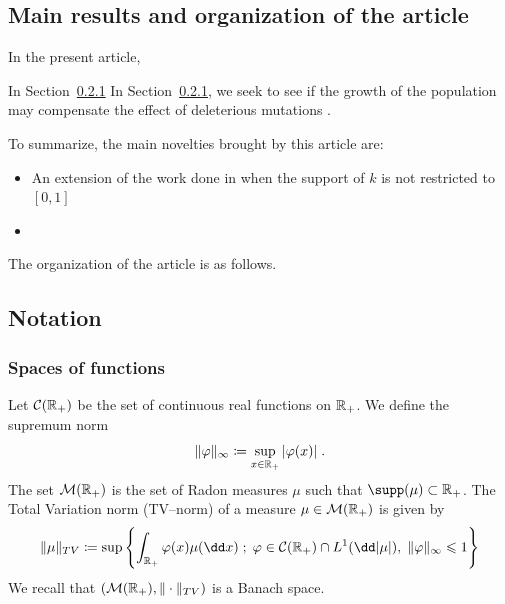 
\subsection{Main results and organization of the article} \mbox{}

In the present article, 

In Section~\ref{}
In Section~\ref{}, we seek to see if the growth of the population may compensate the effect of deleterious mutations . 

To summarize, the main novelties brought by this article are: 
\begin{itemize}
    \item An extension of the work done in \cite{doumic2016time} when the support of $k$ is not restricted to $[0,1]$
    \item 
\end{itemize}

The organization of the article is as follows.

\subsection{Notation}

\subsubsection{Spaces of functions}

Let $\mathcal{C}(\mathbb{R}_+)$ be the set of continuous real functions on $\mathbb{R}_+$. We define the supremum norm
\begin{equation*}
    \|\varphi\|_{\infty} \coloneqq\sup_{x \in \mathbb{R}_+} |\varphi(x)| 
    \; .
\end{equation*}
The set $\mathcal{M}(\mathbb{R}_+)$ is the set of Radon measures $\mu$ such that $\supp(\mu) \subset \RR_+$. The Total Variation norm (TV--norm) of a measure $\mu \in \mathcal{M}(\mathbb{R}_+)$ is given by 
    \begin{equation*}
        \|\mu\|_{TV} \coloneqq\sup \left\{ \int_{\RR_+} \varphi(x) \mu(\dd x)\; ; \; \varphi \in \Ccal(\RR_+)\cap L^1(\dd|\mu|),\; \|\varphi\|_{\infty} \leq 1\right\}
    \end{equation*}
We recall that $\left(\mathcal{M}(\mathbb{R}_+), \|\cdot\|_{TV}\right)$ is a Banach space. 

